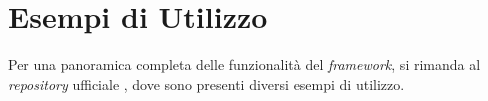 \section{Esempi di Utilizzo}
Per una panoramica completa delle funzionalità del \textit{framework}, si rimanda al \textit{repository} ufficiale \cite{repo}, dove sono presenti diversi esempi di utilizzo.